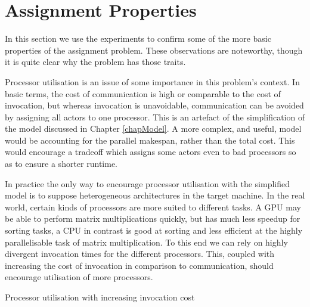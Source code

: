 \section{Assignment Properties}

In this section we use the experiments to confirm some of the more basic properties of the assignment problem.
These observations are noteworthy, though it is quite clear why the problem has those traits.

Processor utilisation is an issue of some importance in this problem's context.
In basic terms, the cost of communication is high or comparable to the cost of invocation, but whereas invocation is unavoidable, communication can be avoided by assigning all actors to one processor.
This is an artefact of the simplification of the model discussed in Chapter \ref{chapModel}.
A more complex, and useful, model would be accounting for the parallel makespan, rather than the total cost.
This would encourage a tradeoff which assigns some actors even to bad processors so as to ensure a shorter runtime.

In practice the only way to encourage processor utilisation with the simplified model is to suppose heterogeneous architectures in the target machine.
In the real world, certain kinds of processors are more suited to different tasks.
A GPU may be able to perform matrix multiplications quickly, but has much less speedup for sorting tasks, a CPU in contrast is good at sorting and less efficient at the highly parallelisable task of matrix multiplication.
To this end we can rely on highly divergent invocation times for the different processors.
This, coupled with increasing the cost of invocation in comparison to communication, should encourage utilisation of more processors.

\begin{table}
\begin{center}
	
\caption{Processor utilisation with increasing invocation cost}
\label{figExScale}
\end{center}
\end{table}

